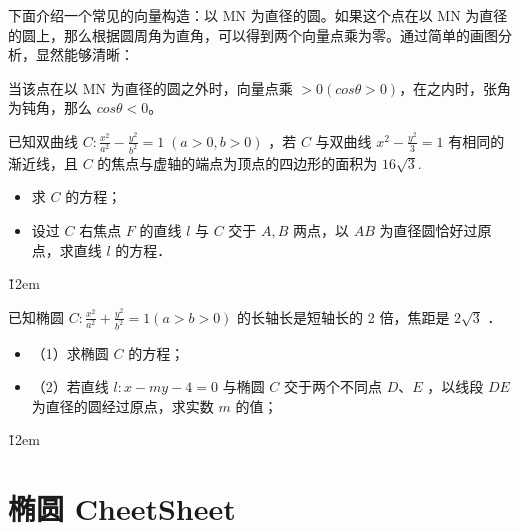 \vspace{1em}

\begin{theorem}
    下面介绍一个常见的向量构造：以 MN 为直径的圆。如果这个点在以 MN 为直径的圆上，那么根据圆周角为直角，可以得到两个向量点乘为零。通过简单的画图分析，显然能够清晰：

    当该点在以 MN 为直径的圆之外时，向量点乘 $> 0 (cos\theta > 0)$，在之内时，张角为钝角，那么 $cos\theta < 0 $。
\end{theorem}

\vspace{1em}

\begin{example}
    已知双曲线 $C: \frac{x^{2}}{a^{2}}-\frac{y^{2}}{b^{2}}=1\;(a>0, b>0)$ ，若 $C$ 与双曲线 $x^{2}-\frac{y^{2}}{3}=1$ 有相同的渐近线，且 $C$ 的焦点与虚轴的端点为顶点的四边形的面积为 $16 \sqrt{3}$.

    \begin{itemize}
        \item 求 $C$ 的方程；
        \item 设过 $C$ 右焦点 $F$ 的直线 $l$ 与 $C$ 交于 $A, B$ 两点，以 $AB$ 为直径圆恰好过原点，求直线 $l$ 的方程．
    \end{itemize}
\end{example}

\v{12em}

\begin{example}
    已知椭圆 $C: \frac{x^2}{a^2}+\frac{y^2}{b^2}=1(a>b>0)$ 的长轴长是短轴长的 2 倍，焦距是 $2 \sqrt{3}$ ．
    \begin{itemize}
        \item （1）求椭圆 $C$ 的方程；
        \item （2）若直线 $l: x-m y-4=0$ 与椭圆 $C$ 交于两个不同点 $D$、$E$ ，以线段 $D E$ 为直径的圆经过原点，求实数 $m$ 的值；
    \end{itemize}
\end{example}

\v{12em}

\section{椭圆 CheetSheet}

